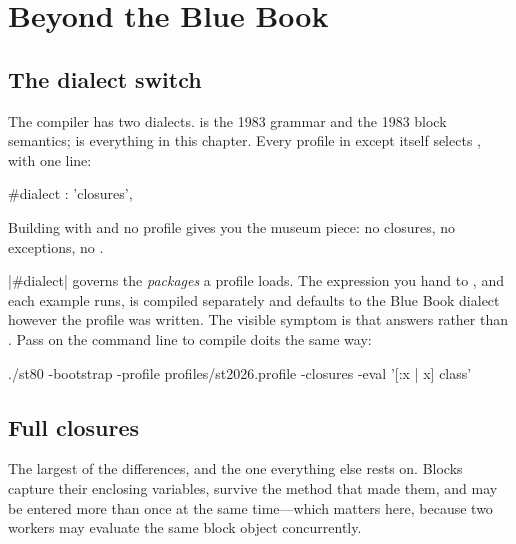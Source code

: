 \chapter{Beyond the Blue Book}
\label{ch:beyond}


\section{The dialect switch}

The compiler has two dialects.  is the 1983 grammar and the 1983
block semantics;  is everything in this chapter. Every profile in
 except  itself selects , with one line:

\begin{st}
#dialect : 'closures',
\end{st}

Building with  and no profile gives you the
museum piece: no closures, no exceptions, no .

\begin{stwarn}
\ct|#dialect| governs the \emph{packages} a profile loads. The expression
you hand to , and each example  runs, is compiled
separately and defaults to the Blue Book dialect however the profile was
written. The visible symptom is that  answers
 rather than . Pass  on the
command line to compile doits the same way:

\begin{sh}
./st80 -bootstrap -profile profiles/st2026.profile -closures -eval '[:x | x] class'
\end{sh}
\end{stwarn}

\section{Full closures}

The largest of the differences, and the one everything else rests on. Blocks
capture their enclosing variables, survive the method that made them, and may
be entered more than once at the same time---which matters here, because two
workers may evaluate the same block object concurrently.

